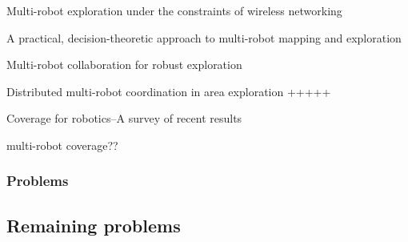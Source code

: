 Multi-robot exploration under the constraints of wireless networking
\cite{rooker2007multi}

A practical, decision-theoretic approach to multi-robot mapping and exploration
\cite{ko2003practical}

Multi-robot collaboration for robust exploration
\cite{rekleitis2001multi}

Distributed multi-robot coordination in area exploration +++++
\cite{sheng2006distributed}

Coverage for robotics–A survey of recent results

multi-robot coverage??

\subsubsection{Problems}

\subsection{Remaining problems}
